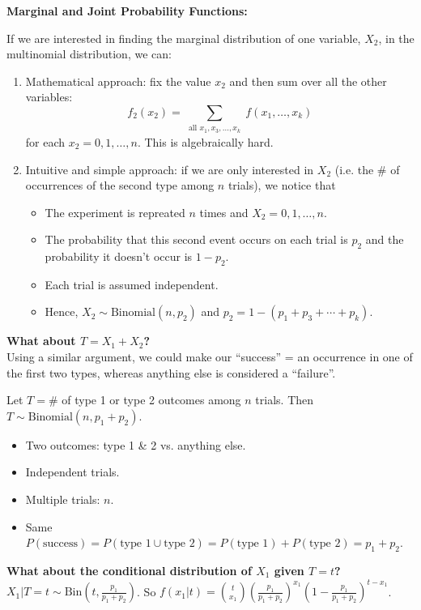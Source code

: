 \textbf{Marginal and Joint Probability Functions:}

If we are interested in finding the marginal distribution of one variable, $X_2$, in the multinomial distribution, we can:

\begin{enumerate}
    \item Mathematical approach: fix the value $x_2$ and then sum over all the other variables:
    \[
        f_2(x_2) = \displaystyle \sum_{\substack{\text{all }x_1,x_3,\ldots ,x_k}} f(x_1,\ldots ,x_k)
    \]
    for each $x_2 = 0,1,\ldots , n$. This is algebraically hard.

    \item Intuitive and simple approach: if we are only interested in $X_2$ (i.e. the $\#$ of occurrences of the second type among $n$ trials), we notice that
    \begin{itemize}
        \item The experiment is repreated $n$ times and $X_2 = 0,1,\ldots ,n$.
        \item The probability that this second event occurs on each trial is $p_2$ and the probability it doesn't occur is $1-p_2$.
        \item Each trial is assumed independent.
        \item Hence, $X_2 \sim \text{Binomial}(n,p_2)$ and $p_2 = 1 - (p_1 + p_3 + \cdots + p_k)$.
    \end{itemize}
\end{enumerate}

\textbf{What about $T = X_1 + X_2$?} \\
Using a similar argument, we could make our ``success'' =  an occurrence in one of the first two types, whereas anything else is considered a ``failure''.

Let $T = \#$ of type 1 or type 2 outcomes among $n$ trials. Then $T \sim \text{Binomial}(n,p_1 + p_2)$.
\begin{itemize}
    \item Two outcomes: type 1 \& 2 vs. anything else.
    \item Independent trials.
    \item Multiple trials: $n$.
    \item Same  $P(\text{success}) = P(\text{type 1} \cup \text{type 2}) = P(\text{type 1}) + P(\text{type 2}) = p_1 + p_2$.
\end{itemize}

\textbf{What about the conditional distribution of $X_1$ given $T = t$?} \\
$X_1 | T=t \sim \text{Bin}(t, \frac{p_1}{p_1 + p_2})$. So $f(x_1|t) = \binom{t}{x_1} \left( \frac{p_1}{p_1 + p_2} \right)^{x_1} \left( 1 - \frac{p_1}{p_1 + p_2} \right)^{t - x_1}$.


